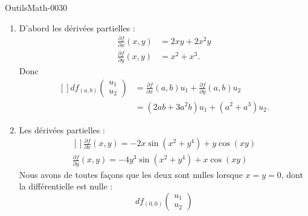 
\begin{corrige}{OutilsMath-0030}

    \begin{enumerate}
        \item
            D'abord les dérivées partielles :
            \begin{subequations}
                \begin{align}
                    \frac{ \partial f }{ \partial x }(x,y)&=2xy+2x^2y\\
                    \frac{ \partial f }{ \partial y }(x,y)&=x^2+x^3.
                \end{align}
            \end{subequations}
            Donc
            \begin{equation}
                \begin{aligned}[]
                    df_{(a,b)}\begin{pmatrix}
                        u_1    \\ 
                        u_2    
                    \end{pmatrix}&=\frac{ \partial f }{ \partial x }(a,b)u_1+\frac{ \partial f }{ \partial y }(a,b)u_2\\
                    &=(2ab+3a^2b)u_1+(a^2+a^3)u_2.
                \end{aligned}
            \end{equation}
        \item
            Les dérivées partielles :
            \begin{equation}
                \begin{aligned}[]
                    \frac{ \partial f }{ \partial x }(x,y)=-2x\sin(x^2+y^4)+y\cos(xy)\\
                    \frac{ \partial f }{ \partial y }(x,y)=-4y^3\sin(x^2+y^4)+x\cos(xy)
                \end{aligned}
            \end{equation}
            Nous avons de toutes façons que les deux sont nulles lorsque $x=y=0$, dont la différentielle est nulle :
            \begin{equation}
                df_{(0,0)}\begin{pmatrix}
                    u_1    \\ 
                    u_2    

\end{pmatrix}
\end{equation}
\end{enumerate}
\end{corrige}
